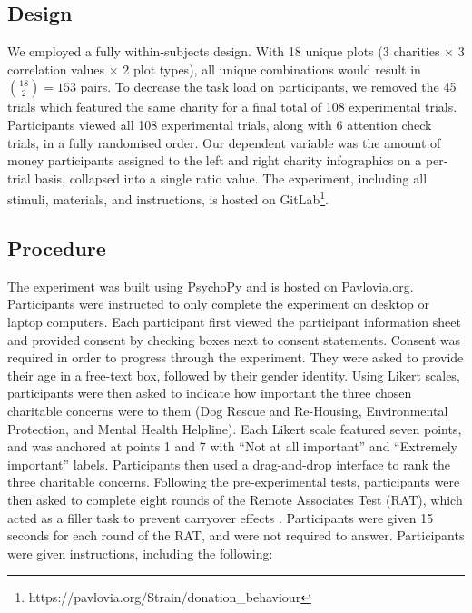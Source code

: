 \documentclass[
  authoryear,
  preprint,
  3p]{elsarticle}
\begin{document}
\subsection{Design}\label{sec-design}

We employed a fully within-subjects design. With 18 unique plots (3
charities \(\times\) 3 correlation values \(\times\) 2 plot types), all
unique combinations would result in \(\binom{18}{2} = 153\) pairs. To
decrease the task load on participants, we removed the 45 trials which
featured the same charity for a final total of 108 experimental trials.
Participants viewed all 108 experimental trials, along with 6 attention
check trials, in a fully randomised order. Our dependent variable was
the amount of money participants assigned to the left and right charity
infographics on a per-trial basis, collapsed into a single ratio value.
The experiment, including all stimuli, materials, and instructions, is
hosted on GitLab\footnote{https://pavlovia.org/Strain/donation\_behaviour}.

\subsection{Procedure}\label{sec-procedure}

The experiment was built using PsychoPy \citep{peirce_2019} and is
hosted on Pavlovia.org. Participants were instructed to only complete
the experiment on desktop or laptop computers. Each participant first
viewed the participant information sheet and provided consent by
checking boxes next to consent statements. Consent was required in order
to progress through the experiment. They were asked to provide their age
in a free-text box, followed by their gender identity. Using Likert
scales, participants were then asked to indicate how important the three
chosen charitable concerns were to them (Dog Rescue and Re-Housing,
Environmental Protection, and Mental Health Helpline). Each Likert scale
featured seven points, and was anchored at points 1 and 7 with ``Not at
all important'' and ``Extremely important'' labels. Participants then
used a drag-and-drop interface to rank the three charitable concerns.
Following the pre-experimental tests, participants were then asked to
complete eight rounds of the Remote Associates Test (RAT), which acted
as a filler task to prevent carryover effects \citep{she_2023}.
Participants were given 15 seconds for each round of the RAT, and were
not required to answer. Participants were given instructions, including
the following:
\end{document}
